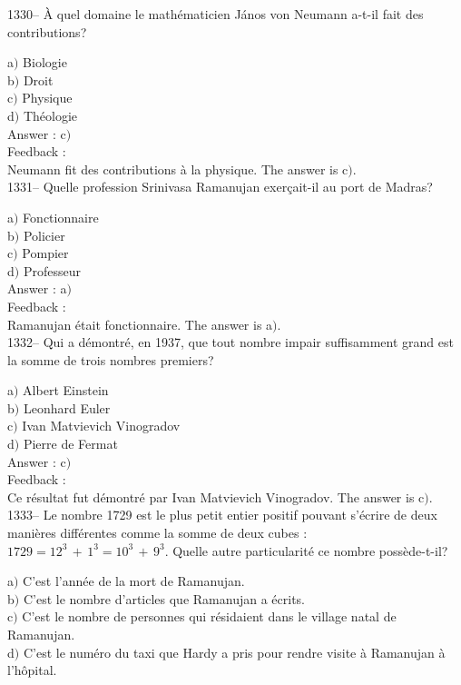 \documentclass[letterpaper, 12pt]{article}
\begin{document}
1330-- \`A quel domaine le math\'ematicien J\'anos von Neumann
a-t-il fait des contributions?

a$)$ Biologie \\
b$)$ Droit \\
c$)$ Physique \\
d$)$ Th\'eologie\\

Answer : c$)$\\

Feedback : \\
Neumann fit des contributions \`a la physique.
The answer is  c$)$.\\


1331-- Quelle profession Srinivasa Ramanujan exer\c cait-il au port
de Madras?

a$)$ Fonctionnaire \\
b$)$ Policier \\
c$)$ Pompier \\
d$)$ Professeur\\

Answer : a$)$\\

Feedback : \\
Ramanujan \'etait fonctionnaire.
The answer is  a$)$.\\

1332-- Qui a d\'emontr\'e, en 1937, que tout nombre impair
suffisamment grand est la somme de trois nombres premiers?

a$)$ Albert Einstein \\
b$)$ Leonhard Euler \\
c$)$ Ivan Matvievich Vinogradov \\
d$)$ Pierre de Fermat\\

Answer : c$)$\\

Feedback : \\
Ce r\'esultat fut d\'emontr\'e par Ivan Matvievich Vinogradov.
The answer is  c$)$.\\




1333-- Le nombre 1729 est le plus petit entier positif pouvant
s'\'ecrire de deux mani\`eres diff\'erentes comme la somme de deux
cubes : $1729=12^3\,+\,1^3=10^3\,+\,9^3$. Quelle autre
particularit\'e ce nombre poss\`ede-t-il?

a$)$ C'est l'ann\'ee de la mort de Ramanujan. \\
b$)$ C'est le nombre d'articles que Ramanujan a \'ecrits. \\
c$)$ C'est le nombre de personnes qui r\'esidaient dans le village natal de
Ramanujan. \\
d$)$ C'est le num\'ero du taxi que Hardy a pris pour rendre visite \`a
Ramanujan \`a l'h\^opital.\\
\end{document}
